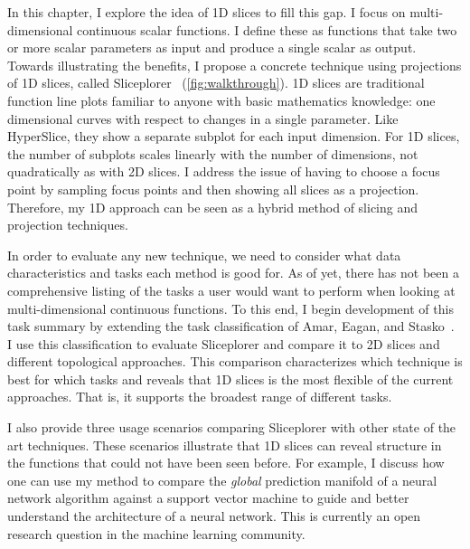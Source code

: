 In this chapter, I explore the idea of 1D slices to fill this gap. I focus on
multi-dimensional continuous scalar functions. I define these as functions that
take two or more scalar parameters as input and produce a single scalar as
output.  Towards illustrating the benefits, I propose a concrete technique
using projections of 1D slices, called Sliceplorer~\cite{Torsney-Weir:2017a}
(\autoref{fig:walkthrough}).  1D slices are traditional function line plots
familiar to anyone with basic mathematics knowledge: one dimensional curves
with respect to changes in a single parameter.  Like HyperSlice, they show a
separate subplot for each input dimension. For 1D slices, the number of
subplots scales linearly with the number of dimensions, not quadratically as
with 2D slices. I address the issue of having to choose a focus point by
sampling focus points and then showing all slices as a projection. Therefore,
my 1D approach can be seen as a hybrid method of slicing and projection
techniques. 

In order to evaluate any new technique, we need to
consider what data characteristics and tasks each method is good for. As of yet, there has not been a comprehensive
listing of the tasks a user would want to perform when looking at
multi-dimensional continuous functions. To this
end, I begin development of this task summary by extending the task
classification of Amar, Eagan, and Stasko~\cite{Amar:2005}. I use this
classification to evaluate Sliceplorer and compare it to 2D slices and
different topological approaches. This comparison characterizes
which technique is best for which tasks and reveals that 1D slices is the most
flexible of the current approaches. That is, it supports the broadest range of
different tasks.

I also provide three usage scenarios comparing Sliceplorer with other state of the art techniques. These scenarios illustrate that 1D
slices can reveal structure in the functions that could not
have been seen before. For example, I discuss how one can use my
method to compare the \emph{global} prediction manifold of a neural
network algorithm against a support vector machine to guide and better understand the architecture of a neural network. This is currently an open research question in the machine learning community.


